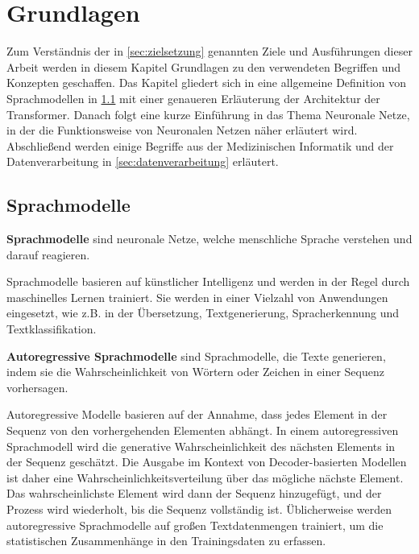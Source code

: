 \chapter{Grundlagen}\label{ch:preliminaries}
Zum Verständnis der in \cref{sec:zielsetzung} genannten Ziele und Ausführungen dieser Arbeit werden in diesem Kapitel Grundlagen zu den verwendeten Begriffen und Konzepten geschaffen.
Das Kapitel gliedert sich in eine allgemeine Definition von Sprachmodellen in \cref{sec:sprachmodelle} mit einer genaueren Erläuterung der Architektur der Transformer.
Danach folgt eine kurze Einführung in das Thema Neuronale Netze, in der die Funktionsweise von Neuronalen Netzen näher erläutert wird.
Abschließend werden einige Begriffe aus der Medizinischen Informatik und der Datenverarbeitung in \cref{sec:datenverarbeitung} erläutert.

\section{Sprachmodelle}\label{sec:sprachmodelle}

\begin{definition}\label{def:sprachmodell}
    \textbf{Sprachmodelle} sind neuronale Netze, welche menschliche Sprache verstehen und darauf reagieren.
\end{definition}
Sprachmodelle basieren auf künstlicher Intelligenz und werden in der Regel durch maschinelles Lernen trainiert.
Sie werden in einer Vielzahl von Anwendungen eingesetzt, wie z.B. in der Übersetzung,
Textgenerierung, Spracherkennung und Textklassifikation.

\begin{definition}\label{def:autoregressive-sprachmodelle}
    \textbf{Autoregressive Sprachmodelle} sind Sprachmodelle, die Texte generieren,
    indem sie die Wahrscheinlichkeit von Wörtern oder Zeichen in einer Sequenz vorhersagen.
\end{definition}

Autoregressive Modelle basieren auf der Annahme, dass jedes Element in der Sequenz von den vorhergehenden Elementen abhängt.
In einem autoregressiven Sprachmodell wird die generative Wahrscheinlichkeit des nächsten Elements in der Sequenz geschätzt.
Die Ausgabe im Kontext von Decoder-basierten Modellen ist daher eine Wahrscheinlichkeitsverteilung über das mögliche nächste Element.
Das wahrscheinlichste Element wird dann der Sequenz hinzugefügt, und der Prozess wird wiederholt, bis die Sequenz vollständig ist.
Üblicherweise werden autoregressive Sprachmodelle auf großen Textdatenmengen trainiert, um die statistischen Zusammenhänge in den Trainingsdaten zu erfassen.

